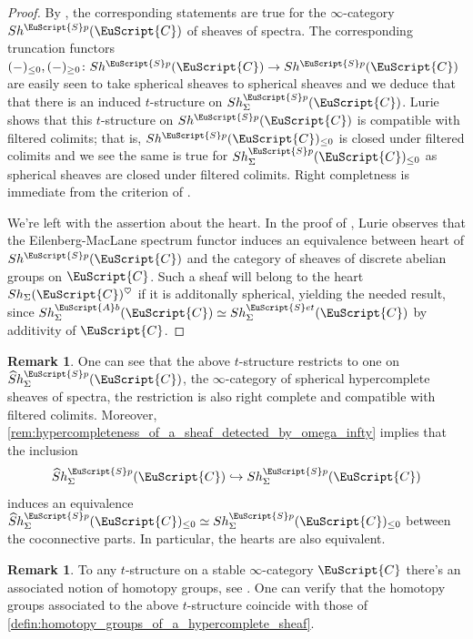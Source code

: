 \documentclass[oneside,a4paper]{amsart}
\newcommand{\euscr}[1]{\EuScript{#1}} %
\newcommand{\ccat}{\euscr{C}} %
\newcommand{\abeliangroups}{\euscr{A}b} %
\newcommand{\spectra}{\euscr{S}p} %
\newcommand{\sets}{\euscr{S}et} %
\newcommand{\hpsheaves}{\widehat{S}h} %
\newcommand{\hpssheavesofspectra}{\hpsheaves_{\Sigma}^{\spectra}} %
\theoremstyle{plain}
\theoremstyle{definition}
\newtheorem{rem}[thm]{Remark}
\theoremstyle{remark}
\begin{document}
\begin{proof}
By \cite[1.3.2.7]{lurie_spectral_algebraic_geometry}, the corresponding statements are true for the $\infty$-category $Sh^{\spectra}(\ccat)$ of sheaves of spectra. The corresponding truncation functors $(-)_{\leq 0}, (-)_{\geq 0} \colon Sh^{\spectra}(\ccat) \rightarrow Sh^{\spectra}(\ccat)$ are easily seen to take spherical sheaves to spherical sheaves and we deduce that that there is an induced $t$-structure on $Sh_{\Sigma}^{\spectra}(\ccat)$. Lurie shows that this $t$-structure on $Sh^{\spectra}(\ccat)$ is compatible with filtered colimits; that is, $Sh^{\spectra}(\ccat)_{\leq 0}$ is closed under filtered colimits and we see the same is true for $Sh_{\Sigma}^{\spectra}(\ccat)_{\leq 0}$ as spherical sheaves are closed under filtered colimits. Right completness is immediate from the criterion of \cite[1.2.1.19]{higher_algebra}.

We're left with the assertion about the heart. In the proof of \cite[1.3.2.7]{lurie_spectral_algebraic_geometry}, Lurie observes that the Eilenberg-MacLane spectrum functor induces an equivalence between heart of $Sh^{\spectra}(\ccat)$ and the category of sheaves of discrete abelian groups on $\ccat$. Such a sheaf will belong to the heart $Sh_{\Sigma}(\ccat)^{\heartsuit}$ if it is additonally spherical, yielding the needed result, since $Sh_{\Sigma}^{\abeliangroups}(\ccat) \simeq Sh^{\sets}_{\Sigma}(\ccat)$ by additivity of $\ccat$. 
\end{proof}

\begin{rem}
\label{rem:tstructure_on_hypercomplete_spherical_sheaves}
One can see that the above $t$-structure restricts to one on $\hpssheavesofspectra(\ccat)$, the $\infty$-category of spherical hypercomplete sheaves of spectra, the restriction is also right complete and compatible with filtered colimits. Moreover, \cref{rem:hypercompleteness_of_a_sheaf_detected_by_omega_infty} implies that the inclusion
\[
\hpssheavesofspectra(\ccat) \hookrightarrow Sh_{\Sigma}^{\spectra}(\ccat)
\]
induces an equivalence $\hpssheavesofspectra(\ccat)_{\leq 0} \simeq Sh_{\Sigma}^{\spectra}(\ccat)_{\leq 0}$ between the coconnective parts. In particular, the hearts are also equivalent. 
\end{rem}

\begin{rem}
\label{rem:homotopy_groups_with_respect_to_natural_t_structure_are_given_by_shaefications_of_homotopy_groups_presheaves}
To any $t$-structure on a stable $\infty$-category $\ccat$ there's an associated notion of homotopy groups, see \cite[1.2.1.11]{higher_algebra}. One can verify that the homotopy groups associated to the above $t$-structure coincide with those of \cref{defin:homotopy_groups_of_a_hypercomplete_sheaf}. 
\end{rem}
\end{document}
